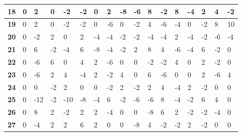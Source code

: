 \begin{longtable}[c]{|l|l|l|l|l|l|l|l|l|l|l|l|l|l|l|l|l|}
\textbf{18} & 0          & 2          & 0          & -2         & -2         & 0          & 2          & -8         & -6         & 8          & -2          & 8           & -4          & 2           & 4           & -2          \\ \hline
\textbf{19} & 0          & 2          & 0          & -2         & -2         & 0          & -6         & 0          & -2         & 4          & -6          & -4          & 0           & -2          & 8           & 10          \\ \hline
\textbf{20} & 0          & -2         & 2          & 0          & 2          & -4         & -4         & -2         & -2         & -4         & -4          & 2           & -4          & -2          & -6          & -4          \\ \hline
\textbf{21} & 0          & 6          & -2         & -4         & 6          & -8         & -4         & -2         & 2          & 8          & 4           & -6          & -4          & 6           & -2          & 0           \\ \hline
\textbf{22} & 0          & -6         & 6          & 0          & 4          & 2          & -6         & 0          & 0          & -2         & -2          & 4           & 0           & 2           & -2          & 0           \\ \hline
\textbf{23} & 0          & -6         & 2          & 4          & -4         & 2          & -2         & 4          & 0          & 6          & -6          & 0           & 0           & 2           & -6          & 4           \\ \hline
\textbf{24} & 0          & 0          & -2         & 2          & 0          & 0          & -2         & 2          & -2         & 2          & 4           & -4          & 2           & -2          & 0           & 0           \\ \hline
\textbf{25} & 0          & -12        & -2         & -10        & -8         & -4         & 6          & -2         & -6         & -6         & 8           & -4          & -2          & 6           & 4           & 0           \\ \hline
\textbf{26} & 0          & 8          & 2          & -2         & 2          & 2          & -4         & 0          & 0          & -8         & 6           & 2           & -2          & -2          & -4          & 0           \\ \hline
\textbf{27} & 0          & -4         & 2          & 2          & 6          & 2          & 0          & 0          & -8         & 4          & -2          & -2          & 2           & -2          & 0           & 0           \\ \hline

\end{longtable}
